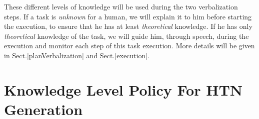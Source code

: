 \documentclass{llncs}
\begin{document}


These different levels of knowledge will be used during the two verbalization steps. If a task is \textit{unknown} for a human, we will explain it to him before starting the execution, to ensure that he has at least \textit{theoretical} knowledge. If he has only \textit{theoretical} knowledge of the task, we will guide him, through speech, during the execution and monitor each step of this task execution. More details will be given in Sect.\ref{planVerbalization} and Sect.\ref{execution}.



\section{Knowledge Level Policy For HTN Generation}
\label{planning}



\end{document}
